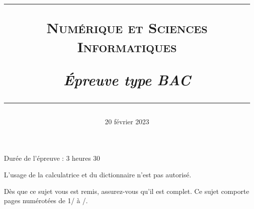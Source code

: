 \documentclass[a4paper, 11pt]{article}
\title{
  \rule{\linewidth}{0.8pt}
  \Large{\scshape{\textbf{Numérique et Sciences Informatiques}}}

  \vspace{0.5cm}
  \large{\textit{Épreuve type BAC}}

  \rule[10pt]{\linewidth}{0.8pt}
    }
\author{}
\date{20 février 2023}
\begin{document}
\maketitle
\thispagestyle{fancy}


\begin{center}
  Durée de l'épreuve : 3 heures 30
\end{center}

\vspace*{1cm}

L'usage de la calculatrice et du dictionnaire n'est pas autorisé.

Dès que ce sujet vous est remis, assurez-vous qu'il est complet.
Ce sujet comporte \pageref{LastPage} pages numérotées de 1/\pageref{LastPage} à \pageref{LastPage}/\pageref{LastPage}.

\vfill
{}

\vspace{0.5cm}


\vfill

\newpage
\end{document}
